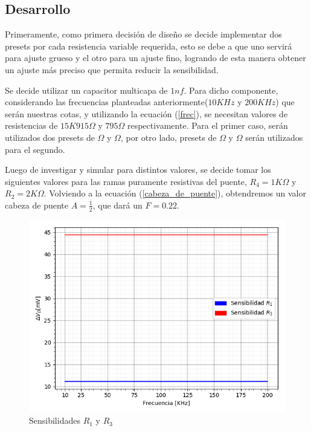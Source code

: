 \subsection{Desarrollo}
Primeramente, como primera decisión de diseño se decide implementar dos presets por cada resistencia variable requerida, esto se debe a que uno servirá para ajuste grueso y el otro para un ajuste fino, logrando de esta manera obtener un ajuste más preciso que permita reducir la sensibilidad. \par
Se decide utilizar un capacitor multicapa de $1nf$. Para dicho componente, considerando las frecuencias planteadas anteriormente($10KHz$ y $200KHz$) que serán nuestras cotas, y utilizando la ecuación (\ref{frec}), se necesitan valores de resistencias de $15K915 \Omega$ y $795 \Omega$ respectivamente. 
Para el primer caso, serán utilizados dos presets de $\Omega$ y $\Omega$, por otro lado, presets de $\Omega$ y $\Omega$ serán utilizados para el segundo. \par
Luego de investigar y simular para distintos valores, se decide tomar los siguientes valores para las ramas puramente resistivas del puente, $R_4=1K\Omega$ y $R_2=2K\Omega$. Volviendo a la ecuación (\ref{cabeza_de_puente}), obtendremos un valor cabeza de puente $A=\frac{1}{2}$, que dará un $F=0.22$.

\begin{figure}[H]
\centering
\includegraphics[scale=0.7]{Graficos/Sensibilidad}
\caption{Sensibilidades $R_1$ y $R_3$}
\label{fig:Sensibilidades}
\end{figure}



